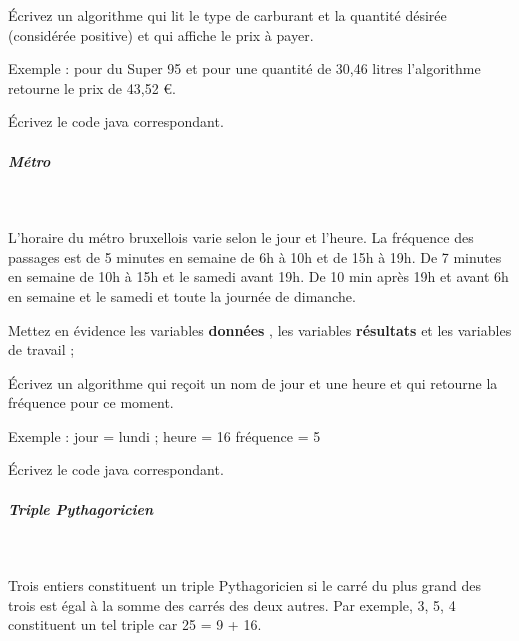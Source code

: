 \documentclass[11pt,a4paper]{article}
\begin{document}
          \'Ecrivez un algorithme qui lit le type de carburant et la quantit\'e d\'esir\'ee (consid\'er\'ee positive) et qui affiche le prix \`a payer.\par
				
          Exemple : pour du Super 95 et pour une quantit\'e de 30,46 litres l'algorithme retourne le prix de 43,52 €.
        
            \par
        \'Ecrivez le code java correspondant.
            \par
        
			
		\subparagraph{M\'etro} 
		
					\textcolor{white}{.} \par
				
          L'horaire du m\'etro bruxellois varie selon le jour et l'heure. La fr\'equence des passages est de 5
          minutes en semaine de 6h \`a 10h et de 15h \`a 19h. De 7 minutes en semaine de 10h \`a 15h et le samedi avant 19h. 
	  De 10 min apr\`es 19h et avant 6h en semaine et le samedi et toute la journ\'ee de dimanche. 
        
            \par
        
          Mettez en \'evidence les variables \textbf{\guillemotleft  donn\'ees \guillemotright }, 
          les variables \textbf{\guillemotleft  r\'esultats \guillemotright } et les variables de travail ;
        
            \par
        
          \'Ecrivez un algorithme qui re\c coit un nom de jour et une heure et qui retourne la fr\'equence pour ce moment. \par
				
          Exemple : jour = \guillemotleft  lundi \guillemotright  ; heure = 16 fr\'equence = 5
        
            \par
        \'Ecrivez le code java correspondant.
            \par
        
			
		\subparagraph{Triple Pythagoricien} 
		
					\textcolor{white}{.} \par
				
          Trois entiers constituent un triple Pythagoricien si le carr\'e du plus grand des trois est \'egal \`a la somme des carr\'es des deux autres. 
          Par exemple, 3, 5, 4 constituent un tel triple car 25 = 9 + 16.
        
\end{document}
